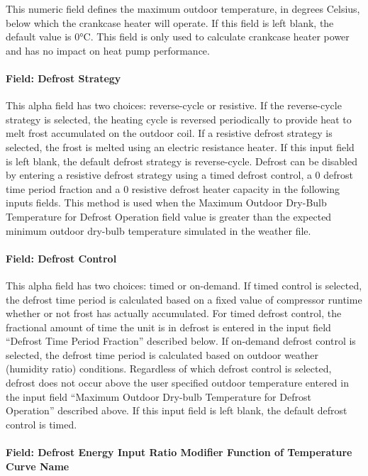 This numeric field defines the maximum outdoor temperature, in degrees Celsius, below which the crankcase heater will operate. If this field is left blank, the default value is 0°C. This field is only used to calculate crankcase heater power and has no impact on heat pump performance.

\paragraph{Field: Defrost Strategy}\label{field-defrost-strategy-001}

This alpha field has two choices: reverse-cycle or resistive. If the reverse-cycle strategy is selected, the heating cycle is reversed periodically to provide heat to melt frost accumulated on the outdoor coil. If a resistive defrost strategy is selected, the frost is melted using an electric resistance heater. If this input field is left blank, the default defrost strategy is reverse-cycle. Defrost can be disabled by entering a resistive defrost strategy using a timed defrost control, a 0 defrost time period fraction and a 0 resistive defrost heater capacity in the following inputs fields. This method is used when the Maximum Outdoor Dry-Bulb Temperature for Defrost Operation field value is greater than the expected minimum outdoor dry-bulb temperature simulated in the weather file.

\paragraph{Field: Defrost Control}\label{field-defrost-control-001}

This alpha field has two choices: timed or on-demand. If timed control is selected, the defrost time period is calculated based on a fixed value of compressor runtime whether or not frost has actually accumulated. For timed defrost control, the fractional amount of time the unit is in defrost is entered in the input field ``Defrost Time Period Fraction'' described below. If on-demand defrost control is selected, the defrost time period is calculated based on outdoor weather (humidity ratio) conditions. Regardless of which defrost control is selected, defrost does not occur above the user specified outdoor temperature entered in the input field ``Maximum Outdoor Dry-bulb Temperature for Defrost Operation'' described above. If this input field is left blank, the default defrost control is timed.

\paragraph{Field: Defrost Energy Input Ratio Modifier Function of Temperature Curve Name}\label{field-defrost-energy-input-ratio-modifier-function-of-temperature-curve-name}

